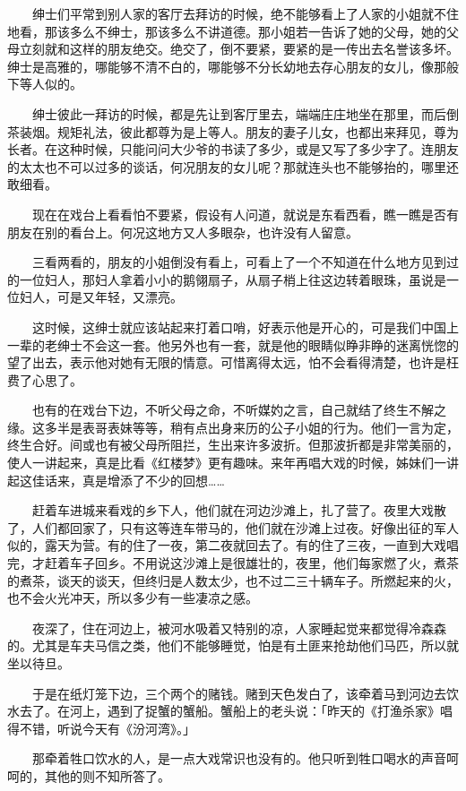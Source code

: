 \documentclass[UTF8]{ctexart}
\begin{document}
　　绅士们平常到别人家的客厅去拜访的时候，绝不能够看上了人家的小姐就不住地看，那该多么不绅士，那该多么不讲道德。那小姐若一告诉了她的父母，她的父母立刻就和这样的朋友绝交。绝交了，倒不要紧，要紧的是一传出去名誉该多坏。绅士是高雅的，哪能够不清不白的，哪能够不分长幼地去存心朋友的女儿，像那般下等人似的。

　　绅士彼此一拜访的时候，都是先让到客厅里去，端端庄庄地坐在那里，而后倒茶装烟。规矩礼法，彼此都尊为是上等人。朋友的妻子儿女，也都出来拜见，尊为长者。在这种时候，只能问问大少爷的书读了多少，或是又写了多少字了。连朋友的太太也不可以过多的谈话，何况朋友的女儿呢？那就连头也不能够抬的，哪里还敢细看。

　　现在在戏台上看看怕不要紧，假设有人问道，就说是东看西看，瞧一瞧是否有朋友在别的看台上。何况这地方又人多眼杂，也许没有人留意。

　　三看两看的，朋友的小姐倒没有看上，可看上了一个不知道在什么地方见到过的一位妇人，那妇人拿着小小的鹅翎扇子，从扇子梢上往这边转着眼珠，虽说是一位妇人，可是又年轻，又漂亮。

　　这时候，这绅士就应该站起来打着口哨，好表示他是开心的，可是我们中国上一辈的老绅士不会这一套。他另外也有一套，就是他的眼睛似睁非睁的迷离恍惚的望了出去，表示他对她有无限的情意。可惜离得太远，怕不会看得清楚，也许是枉费了心思了。

　　也有的在戏台下边，不听父母之命，不听媒妁之言，自己就结了终生不解之缘。这多半是表哥表妹等等，稍有点出身来历的公子小姐的行为。他们一言为定，终生合好。间或也有被父母所阻拦，生出来许多波折。但那波折都是非常美丽的，使人一讲起来，真是比看《红楼梦》更有趣味。来年再唱大戏的时候，姊妹们一讲起这佳话来，真是增添了不少的回想……

　　赶着车进城来看戏的乡下人，他们就在河边沙滩上，扎了营了。夜里大戏散了，人们都回家了，只有这等连车带马的，他们就在沙滩上过夜。好像出征的军人似的，露天为营。有的住了一夜，第二夜就回去了。有的住了三夜，一直到大戏唱完，才赶着车子回乡。不用说这沙滩上是很雄壮的，夜里，他们每家燃了火，煮茶的煮茶，谈天的谈天，但终归是人数太少，也不过二三十辆车子。所燃起来的火，也不会火光冲天，所以多少有一些凄凉之感。

　　夜深了，住在河边上，被河水吸着又特别的凉，人家睡起觉来都觉得冷森森的。尤其是车夫马信之类，他们不能够睡觉，怕是有土匪来抢劫他们马匹，所以就坐以待旦。

　　于是在纸灯笼下边，三个两个的赌钱。赌到天色发白了，该牵着马到河边去饮水去了。在河上，遇到了捉蟹的蟹船。蟹船上的老头说：「昨天的《打渔杀家》唱得不错，听说今天有《汾河湾》。」

　　那牵着牲口饮水的人，是一点大戏常识也没有的。他只听到牲口喝水的声音呵呵的，其他的则不知所答了。
\end{document}
